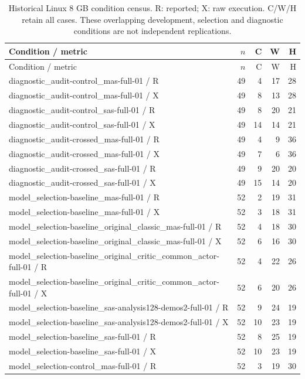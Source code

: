 \begin{longtable}{p{}rrrr}
\caption{Historical Linux 8 GB condition census. R: reported; X: raw execution. C/W/H retain all cases. These overlapping development, selection and diagnostic conditions are not independent replications.}\\
Condition / metric & $n$ & C & W & H\\\hline\endfirsthead
Condition / metric & $n$ & C & W & H\\\hline\endhead
diagnostic\_audit-control\_mas-full-01 / R & 49 & 4 & 17 & 28 \\
diagnostic\_audit-control\_mas-full-01 / X & 49 & 8 & 13 & 28 \\
diagnostic\_audit-control\_sas-full-01 / R & 49 & 8 & 20 & 21 \\
diagnostic\_audit-control\_sas-full-01 / X & 49 & 14 & 14 & 21 \\
diagnostic\_audit-crossed\_mas-full-01 / R & 49 & 4 & 9 & 36 \\
diagnostic\_audit-crossed\_mas-full-01 / X & 49 & 7 & 6 & 36 \\
diagnostic\_audit-crossed\_sas-full-01 / R & 49 & 9 & 20 & 20 \\
diagnostic\_audit-crossed\_sas-full-01 / X & 49 & 15 & 14 & 20 \\
model\_selection-baseline\_mas-full-01 / R & 52 & 2 & 19 & 31 \\
model\_selection-baseline\_mas-full-01 / X & 52 & 3 & 18 & 31 \\
model\_selection-baseline\_original\_classic\_mas-full-01 / R & 52 & 4 & 18 & 30 \\
model\_selection-baseline\_original\_classic\_mas-full-01 / X & 52 & 6 & 16 & 30 \\
model\_selection-baseline\_original\_critic\_common\_actor-full-01 / R & 52 & 4 & 22 & 26 \\
model\_selection-baseline\_original\_critic\_common\_actor-full-01 / X & 52 & 6 & 20 & 26 \\
model\_selection-baseline\_sas-analysis128-demos2-full-01 / R & 52 & 9 & 24 & 19 \\
model\_selection-baseline\_sas-analysis128-demos2-full-01 / X & 52 & 10 & 23 & 19 \\
model\_selection-baseline\_sas-full-01 / R & 52 & 8 & 25 & 19 \\
model\_selection-baseline\_sas-full-01 / X & 52 & 10 & 23 & 19 \\
model\_selection-control\_mas-full-01 / R & 52 & 3 & 19 & 30 \\

\end{longtable}
